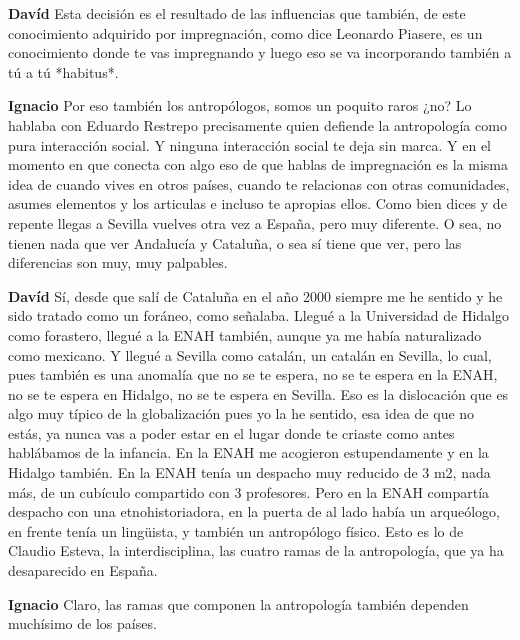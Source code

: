 \documentclass[
  spanish,
  11pt,
  a4paper,
]{scrbook}
\newenvironment{transcripcion}{
    \begin{list}{}{
        \setlength{\leftmargin}{1.5em}  %
        \setlength{\rightmargin}{0em}
        \setlength{\itemsep}{0.2em}     %
        \setlength{\parsep}{0.0em}
        \setlength{\listparindent}{0pt}
    }
}{
    \end{list}
}
\newcommand{\personaje}[1]{\textbf{#1}\quad}
\begin{document}
\begin{transcripcion}
\item \personaje{Davíd} Esta decisión es el resultado de las influencias que también, de este conocimiento adquirido por impregnación, como dice Leonardo Piasere, es un conocimiento donde te vas impregnando y luego eso se va incorporando también a tú a tú *habitus*.

\item \personaje{Ignacio} Por eso también los antropólogos, somos un poquito raros ¿no? Lo hablaba con Eduardo Restrepo precisamente quien defiende la antropología como pura interacción social. Y ninguna interacción social te deja sin marca. Y en el momento en que conecta con algo eso de que hablas de impregnación es la misma idea de cuando vives en otros países, cuando te relacionas con otras comunidades, asumes elementos y los articulas e incluso te apropias ellos. Como bien dices y de repente llegas a Sevilla vuelves otra vez a España, pero muy diferente. O sea, no tienen nada que ver Andalucía y Cataluña, o sea sí tiene que ver, pero las diferencias son muy, muy palpables.

\item \personaje{Davíd} Sí, desde que salí de Cataluña en el año 2000 siempre me he sentido y he sido tratado como un foráneo, como señalaba. Llegué a la Universidad de Hidalgo como forastero, llegué a la ENAH también, aunque ya me había naturalizado como mexicano. Y llegué a Sevilla como catalán, un catalán en Sevilla, lo cual, pues también es una anomalía que no se te espera, no se te espera en la ENAH, no se te espera en Hidalgo, no se te espera en Sevilla. Eso es la dislocación que es algo muy típico de la globalización pues yo la he sentido, esa idea de que no estás, ya nunca vas a poder estar en el lugar donde te criaste como antes hablábamos de la infancia. En la ENAH me acogieron estupendamente y en la Hidalgo también. En la ENAH tenía un despacho muy reducido de 3 m2, nada más, de un cubículo compartido con 3 profesores. Pero en la ENAH compartía despacho con una etnohistoriadora, en la puerta de al lado había un arqueólogo, en frente tenía un lingüista, y también un antropólogo físico. Esto es lo de Claudio Esteva, la interdisciplina, las cuatro ramas de la antropología, que ya ha desaparecido en España.

\item \personaje{Ignacio} Claro, las ramas que componen la antropología también dependen muchísimo de los países.


\end{transcripcion}
\end{document}
